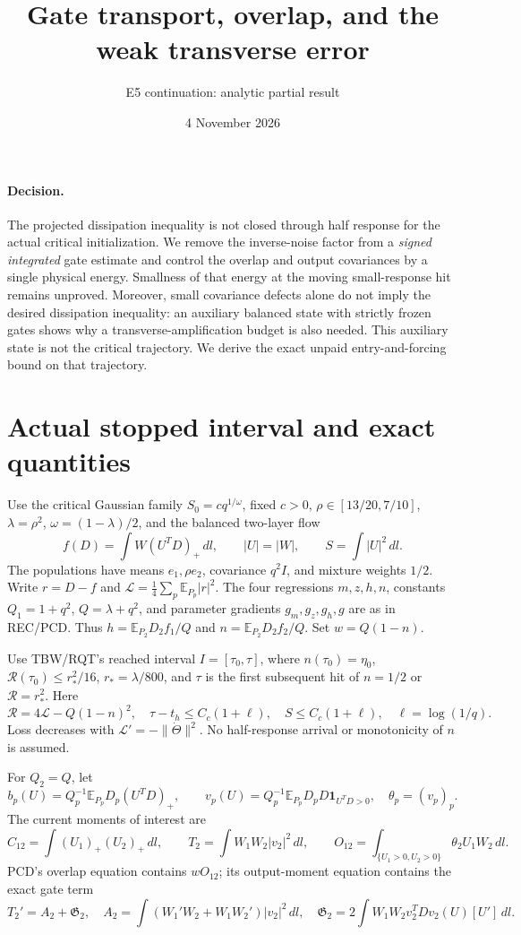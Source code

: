 \documentclass[11pt]{article}
\title{Gate transport, overlap, and the weak transverse error}
\author{E5 continuation: analytic partial result}
\date{4 November 2026}
\newcommand{\E}{\mathbb E}\newcommand{\dd}{\,d}
\begin{document}
\maketitle

\paragraph{Decision.}
The projected dissipation inequality is not closed through half
response for the actual critical initialization. We remove the
inverse-noise factor from a \emph{signed integrated} gate estimate
and control the overlap and output covariances by a single physical
energy. Smallness of that energy at the moving small-response
hit remains unproved. Moreover, small covariance defects alone do not imply the
desired dissipation inequality: an auxiliary balanced state with
strictly frozen gates shows why a transverse-amplification budget
is also needed. This auxiliary state is not the critical trajectory.
We derive the exact unpaid entry-and-forcing bound on that trajectory.

\section{Actual stopped interval and exact quantities}
Use the critical Gaussian family $S_0=cq^{1/\omega}$, fixed $c>0$,
$\rho\in[13/20,7/10]$, $\lambda=\rho^2$,
$\omega=(1-\lambda)/2$, and the balanced two-layer flow
\[
 f(D)=\int W(U^TD)_+\dd l,\qquad |U|=|W|,\qquad
 S=\int |U|^2\dd l.
\]
The populations have means $e_1,\rho e_2$, covariance $q^2I$,
and mixture weights $1/2$. Write $r=D-f$ and
$\mathcal L=\frac14\sum_p\E_{P_p}|r|^2$.
The four regressions $m,z,h,n$, constants $Q_1=1+q^2$,
$Q=\lambda+q^2$, and parameter gradients $g_m,g_z,g_h,g$
are as in REC/PCD. Thus $h=\E_{P_2}D_2f_1/Q$ and
$n=\E_{P_2}D_2f_2/Q$. Set $w=Q(1-n)$.

Use TBW/RQT's reached interval $I=[\tau_0,\tau]$, where
$n(\tau_0)=\eta_0$, $\mathcal R(\tau_0)\le r_*^2/16$,
$r_*=\lambda/800$, and $\tau$ is the first subsequent hit
of $n=1/2$ or $\mathcal R=r_*^2$. Here
\[
 \mathcal R=4\mathcal L-Q(1-n)^2,
 \quad \tau-t_h\le C_c(1+\ell),\quad
 S\le C_c(1+\ell),\quad \ell=\log(1/q).
\]
Loss decreases with $\mathcal L'=-\|\dot\Theta\|^2$.
No half-response arrival or monotonicity of $n$ is assumed.

For $Q_2=Q$, let
\[
 b_p(U)=Q_p^{-1}\E_{P_p}D_p(U^TD)_+,\qquad
 v_p(U)=Q_p^{-1}\E_{P_p}D_pD\mathbf1_{U^TD>0},
 \quad \theta_p=(v_p)_p.
\]
The current moments of interest are
\[
 C_{12}=\int(U_1)_+(U_2)_+\dd l,\qquad
 T_2=\int W_1W_2|v_2|^2\dd l,\qquad
 O_{12}=\int_{\{U_1>0,U_2>0\}}\theta_2U_1W_2\dd l.
\]
PCD's overlap equation contains $wO_{12}$; its output-moment
equation contains the exact gate term
\begin{equation}\label{an04gtmv1:gate}
 T_2'=A_2+\mathfrak G_2,\quad
 A_2=\int(W_1'W_2+W_1W_2')|v_2|^2\dd l,\quad
 \mathfrak G_2=2\int W_1W_2v_2^TDv_2(U)[U']\dd l.
\end{equation}
\end{document}
